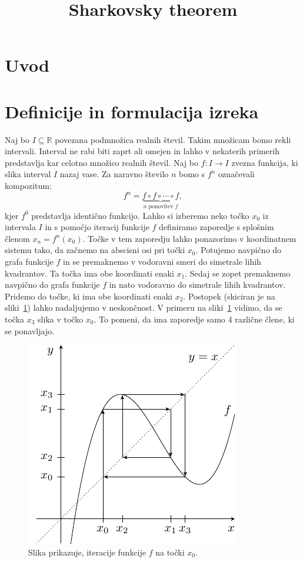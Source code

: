 \documentclass[mat2]{fmfdelo}
\title{Sharkovsky theorem}
\newcommand{\R}{\mathbb R}
\begin{document}
\section{Uvod}


\section{Definicije in formulacija izreka}
Naj bo $I\subseteq \R$ povezana podmnožica realnih števil. Takim množicam bomo rekli intervali. Interval ne rabi biti zaprt ali omejen in lahko v nekaterih primerih predstavlja kar celotno množico realnih števil. Naj bo $f:I \to I$ zvezna funkcija, ki slika interval $I$ nazaj vase. Za naravno število $n$ bomo s $f^n$ označevali kompozitum:
$$f^n = \underbrace{f \circ f \circ \cdots \circ f}_{n \text{ ponovitev } f},$$
kjer $f^0$ predstavlja identično funkcijo. Lahko si izberemo neko točko $x_0$ iz intervala $I$ in s pomočjo iteracij funkcije $f$ definiramo zaporedje s splošnim členom $x_n = f^n(x_0)$. Točke v tem zaporedju lahko ponazorimo v koordinatnem sistemu tako, da začnemo na abscisni osi pri točki $x_0$. Potujemo navpično do grafa funkcije $f$ in se premaknemo v vodoravni smeri do simetrale lihih kvadrantov. Ta točka ima obe koordinati enaki $x_1$. Sedaj se zopet premaknemo navpično do grafa funkcije $f$ in nato vodoravno do simetrale lihih kvadrantov. Pridemo do točke, ki ima obe koordinati enaki $x_2$. Postopek (skiciran je na sliki~\ref{fig:iteracije}) lahko nadaljujemo v neskončnost. V primeru na sliki~\ref{fig:iteracije} vidimo, da se točka $x_3$ slika v točko $x_0$. To pomeni, da ima zaporedje samo 4 različne člene, ki se ponavljajo.

\begin{figure}[h]
  \centering
  \includegraphics[]{images/iteracije_f.pdf}
  \caption[Primer vektorske slike.]{Slika prikazuje, iteracije funkcije $f$ na točki $x_0$.}
  \label{fig:iteracije}
\end{figure}
\end{document}
